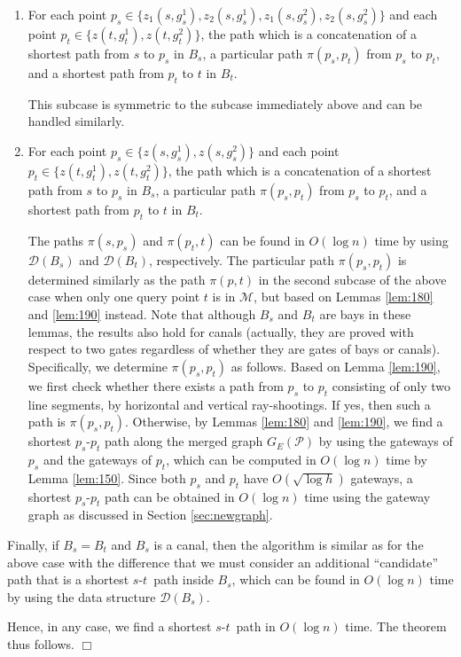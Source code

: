 \documentclass[english,runningheads,11pt]{llncs}
\def\calP{\mathcal{P}}
\def\calM{\mathcal{M}}
\def\calD{\mathcal{D}}
\def\st{$s$-$t$}
\newenvironment{proof}{\noindent {\textbf{Proof:}}\rm}{\hfill $\Box$\rm}
\begin{document}
\begin{proof}
\begin{description}
\begin{enumerate}
\item
For each point $p_s\in
\{z_1(s,g_s^1),z_2(s,g_s^1),z_1(s,g_s^2),z_2(s,g_s^2)\}$ and each point
$p_t\in \{z(t,g_t^1),z(t,g_t^2)\}$, the path which is a concatenation
of a shortest path from $s$ to $p_s$ in $B_s$, a particular path
$\pi(p_s,p_t)$ from $p_s$ to $p_t$, and a shortest path from $p_t$ to
$t$ in $B_t$.

This subcase is symmetric to the subcase immediately above and can be handled similarly.

\item
For each point $p_s\in \{z(s,g_s^1),z(s,g_s^2)\}$ and each point $p_t\in \{z(t,g_t^1),z(t,g_t^2)\}$, the path
which is a concatenation of a shortest path from $s$ to $p_s$ in $B_s$, a particular path $\pi(p_s,p_t)$ from $p_s$ to $p_t$, and a shortest path from $p_t$ to $t$ in $B_t$.

The paths $\pi(s,p_s)$ and $\pi(p_t,t)$ can be found in
$O(\log n)$ time by using $\calD(B_s)$ and $\calD(B_t)$, respectively.
The particular path $\pi(p_s,p_t)$ is determined similarly as the path
$\pi(p,t)$ in the second subcase of the above case when only
one query point $t$ is in $\calM$, but based on Lemmas \ref{lem:180} and
\ref{lem:190} instead. Note that although $B_s$ and $B_t$ are bays in
these lemmas, the results also hold for canals (actually, they
are proved with respect to two gates regardless of whether they are gates of
bays or canals). Specifically, we determine $\pi(p_s,p_t)$ as follows.
Based on Lemma \ref{lem:190}, we first check whether there exists a
path from $p_s$ to $p_t$ consisting of only two line segments, by
horizontal and vertical ray-shootings. If yes, then such a path is
$\pi(p_s,p_t)$. Otherwise, by Lemmas \ref{lem:180} and \ref{lem:190}, we
find a shortest $p_s$-$p_t$ path along the merged graph $G_E(\calP)$
by using the gateways of $p_s$ and the gateways of $p_t$, which
can be computed in $O(\log n)$ time by Lemma \ref{lem:150}.
Since both $p_s$ and $p_t$ have
$O(\sqrt{\log h})$ gateways, a shortest $p_s$-$p_t$ path can be obtained
in $O(\log n)$ time using the gateway graph as discussed in Section \ref{sec:newgraph}.
\end{enumerate}

\end{description}


Finally, if $B_s=B_t$ and $B_s$ is a canal, then the algorithm is similar as for
the above case with the difference that we must consider an additional
``candidate'' path that is a shortest \st\ path inside $B_s$, which
can be found in $O(\log n)$ time by using the data structure $\calD(B_s)$.

Hence, in any case, we find a shortest \st\ path in $O(\log n)$ time.
The theorem thus follows.
\end{proof}
\end{document}
